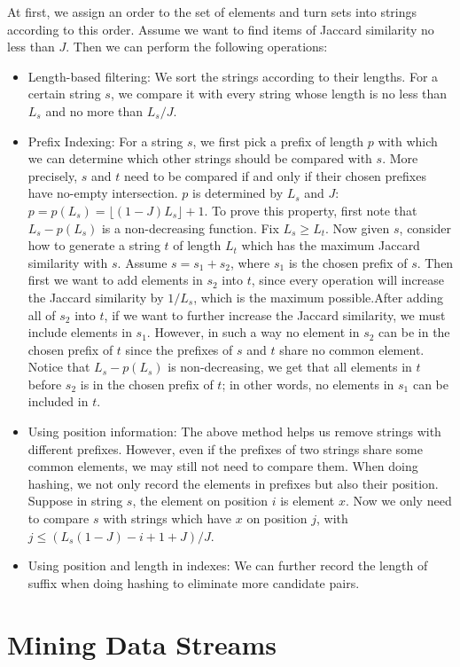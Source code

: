\documentclass{article}
\begin{document}
At first, we assign an order to the set of elements and turn sets into strings according to this order. Assume we want to find items of Jaccard similarity no less than $J$. Then we can perform the following operations:
\begin{itemize}
\item Length-based filtering: We sort the strings according to their lengths. For a certain string $s$, we compare it with every string whose length is no less than $L_s$ and no more than $L_s/J$.
\item Prefix Indexing: For a string $s$, we first pick a prefix of length $p$ with which we can determine which other strings should be compared with $s$. More precisely, $s$ and $t$ need to be compared if and only if their chosen prefixes have no-empty intersection. $p$ is determined by $L_s$ and $J$: $p=p(L_s)=\lfloor(1-J)L_s\rfloor+1$. To prove this property, first note that $L_s-p(L_s)$ is a non-decreasing function. Fix $L_s\ge L_t$. Now given $s$, consider how to generate a string $t$ of length $L_t$ which has the maximum Jaccard similarity with $s$. Assume $s=s_1+s_2$, where $s_1$ is the chosen prefix of $s$. Then first we want to add elements in $s_2$ into $t$, since every operation will increase the Jaccard similarity by $1/L_s$, which is the maximum possible.After adding all of $s_2$ into $t$, if we want to further increase the Jaccard similarity, we must include elements in $s_1$. However, in such a way no element in $s_2$ can be in the chosen prefix of $t$ since the prefixes of $s$ and $t$ share no common element. Notice that $L_s-p(L_s)$ is non-decreasing, we get that all elements in $t$ before $s_2$ is in the chosen prefix of $t$; in other words, no elements in $s_1$ can be included in $t$.
\item Using position information: The above method helps us remove strings with different prefixes. However, even if the prefixes of two strings share some common elements, we may still not need to compare them. When doing hashing, we not only record the elements in prefixes but also their position. Suppose in string $s$, the element on position $i$ is element $x$. Now we only need to compare $s$ with strings which have $x$ on position $j$, with $j\le(L_s(1-J)-i+1+J)/J$.
\item Using position and length in indexes: We can further record the length of suffix when doing hashing to eliminate more candidate pairs.
\end{itemize}

\section*{Mining Data Streams}
\end{document}
